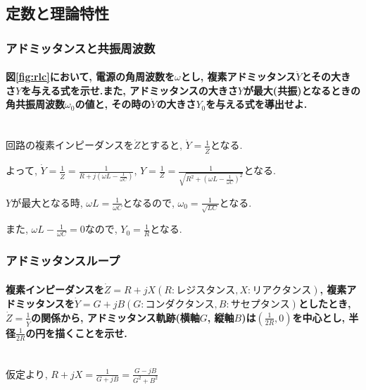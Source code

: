 \documentclass[titlepage]{jsarticle}
\begin{document}
    \subsection{定数と理論特性}
        \subsubsection{アドミッタンスと共振周波数}
            \paragraph{図\ref{fig:rlc}において, 電源の角周波数を$\omega$とし, 複素アドミッタンス$\dot{Y}$とその大きさ$Y$を与える式を示せ.また, アドミッタンスの大きさ$Y$が最大(共振)となるときの角共振周波数$\omega_0$の値と, その時の$\dot{Y}$の大きさ$Y_0$を与える式を導出せよ.}
            \mbox{} \\

                回路の複素インピーダンスを$\dot{Z}$とすると,
                $\displaystyle\dot{Y} = \frac{1}{\dot{Z}}$となる.

                よって, $\displaystyle\dot{Y} = \frac{1}{\dot{Z}} = \frac{1}{R + j(\omega L - \frac{1}{\omega C})}$,
                $\displaystyle Y = \frac{1}{Z} = \frac{1}{\sqrt{R^2 + (\omega L - \frac{1}{\omega C})^2}}$となる.

                $Y$が最大となる時, $\displaystyle \omega L = \frac{1}{\omega C}$となるので,
                $\displaystyle\omega_0 = \frac{1}{\sqrt{LC}}$となる.

                また, $\displaystyle\omega L - \frac{1}{\omega C} = 0$なので, $\displaystyle Y_0 = \frac{1}{R}$となる.

        \subsubsection{アドミッタンスループ}
            \paragraph{複素インピーダンスを$\dot{Z} = R + jX (R: レジスタンス, X: リアクタンス)$, 複素アドミッタンスを$\dot{Y} = G + jB (G: コンダクタンス, B: サセプタンス)$としたとき, $\displaystyle\dot{Z} = \frac{1}{\dot{Y}}$の関係から, アドミッタンス軌跡(横軸$G$, 縦軸$B$)は$\displaystyle\left(\frac{1}{2R}, 0\right)$を中心とし, 半径$\displaystyle\frac{1}{2R}$の円を描くことを示せ.}
            \mbox{} \\

                仮定より, $\displaystyle R + jX = \frac{1}{G + jB} = \frac{G - jB}{G^2 + B^2}$
                
\end{document}
